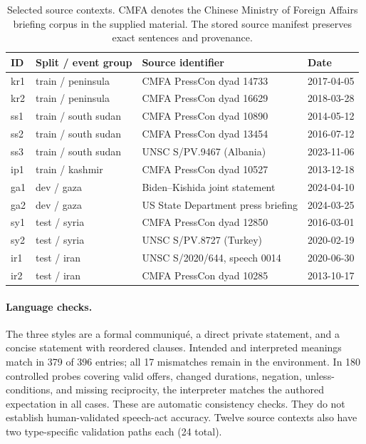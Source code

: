 \begin{table}[t]
\centering\small
\begin{tabular}{llll}
\toprule
ID & Split / event group & Source identifier & Date \\
\midrule
kr1 & train / peninsula & CMFA PressCon dyad 14733 & 2017-04-05 \\
kr2 & train / peninsula & CMFA PressCon dyad 16629 & 2018-03-28 \\
ss1 & train / south sudan & CMFA PressCon dyad 10890 & 2014-05-12 \\
ss2 & train / south sudan & CMFA PressCon dyad 13454 & 2016-07-12 \\
ss3 & train / south sudan & UNSC S/PV.9467 (Albania) & 2023-11-06 \\
ip1 & train / kashmir & CMFA PressCon dyad 10527 & 2013-12-18 \\
ga1 & dev / gaza & Biden--Kishida joint statement & 2024-04-10 \\
ga2 & dev / gaza & US State Department press briefing & 2024-03-25 \\
sy1 & test / syria & CMFA PressCon dyad 12850 & 2016-03-01 \\
sy2 & test / syria & UNSC S/PV.8727 (Turkey) & 2020-02-19 \\
ir1 & test / iran & UNSC S/2020/644, speech 0014 & 2020-06-30 \\
ir2 & test / iran & CMFA PressCon dyad 10285 & 2013-10-17 \\
\bottomrule
\end{tabular}
\caption{Selected source contexts. CMFA denotes the Chinese Ministry of Foreign Affairs briefing corpus in the supplied material. The stored source manifest preserves exact sentences and provenance.}
\label{tab:sources}
\end{table}

\paragraph{Language checks.}
The three styles are a formal communiqu\'e, a direct private statement, and a concise statement with reordered clauses. Intended and interpreted meanings match in 379 of 396 entries; all 17 mismatches remain in the environment. In 180 controlled probes covering valid offers, changed durations, negation, unless-conditions, and missing reciprocity, the interpreter matches the authored expectation in all cases. These are automatic consistency checks. They do not establish human-validated speech-act accuracy. Twelve source contexts also have two type-specific validation paths each (24 total).

